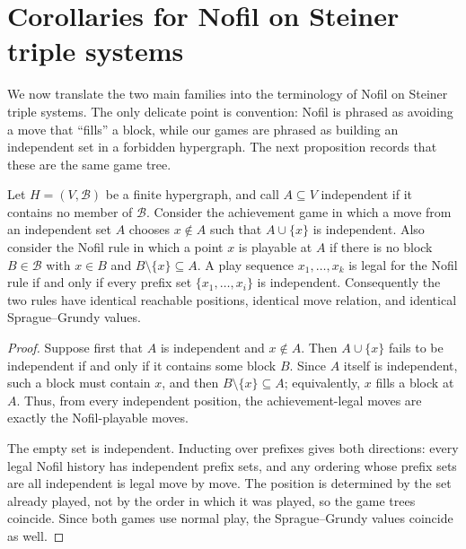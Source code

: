 \section{Corollaries for Nofil on Steiner triple systems}
\label{sec:nofil-corollaries}

We now translate the two main families into the terminology of Nofil on Steiner triple
systems. The only delicate point is convention: Nofil is phrased as avoiding a move that
``fills'' a block, while our games are phrased as building an independent set in a forbidden
hypergraph. The next proposition records that these are the same game tree.

\begin{proposition}
\label{prop:nofil-convention-equivalence}
Let $H=(V,\mathcal B)$ be a finite hypergraph, and call $A\subseteq V$ independent if it
contains no member of $\mathcal B$. Consider the achievement game in which a move from
an independent set $A$ chooses $x\notin A$ such that $A\cup\{x\}$ is independent. Also
consider the Nofil rule in which a point $x$ is playable at $A$ if there is no block
$B\in\mathcal B$ with $x\in B$ and $B\setminus\{x\}\subseteq A$. A play sequence
$x_1,\ldots,x_k$ is legal for the Nofil rule if and only if every prefix set
$\{x_1,\ldots,x_i\}$ is independent. Consequently the two rules have identical reachable
positions, identical move relation, and identical Sprague--Grundy values.
\end{proposition}

\begin{proof}
Suppose first that $A$ is independent and $x\notin A$. Then $A\cup\{x\}$ fails to be
independent if and only if it contains some block $B$. Since $A$ itself is independent,
such a block must contain $x$, and then $B\setminus\{x\}\subseteq A$; equivalently, $x$
fills a block at $A$. Thus, from every independent position, the achievement-legal moves
are exactly the Nofil-playable moves.

The empty set is independent. Inducting over prefixes gives both directions: every legal
Nofil history has independent prefix sets, and any ordering whose prefix sets are all
independent is legal move by move. The position is determined by the set already played,
not by the order in which it was played, so the game trees coincide. Since both games use
normal play, the Sprague--Grundy values coincide as well.
\end{proof}

